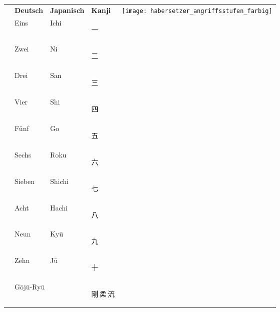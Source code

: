 	\setcounter{num}{10}\setcounter{numz}{0}
	\null\vfill\null	
	\begin{tabularx}{\textwidth}{lllll}		
		& \textbf{Deutsch} 	& \textbf{Japanisch} 	& \textbf{Kanji} &\multirow{13}{*}{\texttt{[image: habersetzer\_angriffsstufen\_farbig]}}\\
		\ctuz 	& Eins 				& Ichi 					& \begin{CJK*}{UTF8}{ipxm}\color{Navy}一\end{CJK*} 	& \\
		\ctuz 	& Zwei 				& Ni 					& \begin{CJK*}{UTF8}{ipxm}\color{Navy}二\end{CJK*} 	& \\ 
		\ctuz 	& Drei 				& San 					& \begin{CJK*}{UTF8}{ipxm}\color{Navy}三\end{CJK*} 	& \\
		\ctuz 	& Vier 				& Shi 					& \begin{CJK*}{UTF8}{ipxm}\color{Navy}四\end{CJK*} 	& \\
		\ctuz 	& Fünf 				& Go 					& \begin{CJK*}{UTF8}{ipxm}\color{Navy}五\end{CJK*} 	& \\
		\ctuz 	& Sechs 			& Roku 					& \begin{CJK*}{UTF8}{ipxm}\color{Navy}六\end{CJK*} 	& \\
		\ctuz 	& Sieben 			& Shichi 				& \begin{CJK*}{UTF8}{ipxm}\color{Navy}七\end{CJK*} 	& \\
		\ctuz 	& Acht 				& Hachi 				& \begin{CJK*}{UTF8}{ipxm}\color{Navy}八\end{CJK*} 	& \\
		\ctuz 	& Neun 				& Ky\={u} 					& \begin{CJK*}{UTF8}{ipxm}\color{Navy}九\end{CJK*} 	& \\
		\ctuz 	& Zehn 				& J\={u} 					& \begin{CJK*}{UTF8}{ipxm}\color{Navy}十\end{CJK*} 	& \\
		\addlinespace
		& \multicolumn{2}{l}{G\={o}j\={u}-Ry\={u}}	& {\LARGE \begin{CJK*}{UTF8}{ipxm}\color{GKD}剛\,柔\,流\end{CJK*}}        & \\ 	

\end{tabularx}
